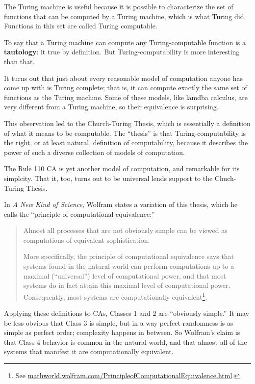 \documentclass[10pt]{book}
\begin{document}
The Turing machine is useful because it is possible to characterize
the set of functions that can be computed by a Turing machine,
which is what Turing did.  Functions in this set are
called Turing computable.

To say that a Turing machine can compute any Turing-computable
function is a {\bf tautology}: it true by definition.  But
Turing-computability is more interesting than that.

It turns out that just about every reasonable model of computation
anyone has come up with is Turing complete; that is, it can compute
exactly the same set of functions as the Turing machine.
Some of these models, like lamdba calculus, are very different
from a Turing machine, so their equivalence is surprising.

This observation led to the Church-Turing Thesis, which is
essentially a definition of what it means to be computable.
The ``thesis'' is that Turing-computability is the right,
or at least natural, definition of computability, because 
it describes the power of such a diverse collection of models
of computation.

The Rule 110 CA is yet another model of computation, and remarkable
for its simplcity.  That it, too, turns out to be universal lends
support to the Chuch-Turing Thesis.

In {\em A New Kind of Science}, Wolfram states a variation of this
thesis, which he calls the ``principle of computational equivalence:''

\begin{quote}
Almost all processes that are not obviously simple can be viewed as
computations of equivalent sophistication.

More specifically, the principle of computational equivalence says
that systems found in the natural world can perform computations up to
a maximal (``universal'') level of computational power, and that most
systems do in fact attain this maximal level of computational
power. Consequently, most systems are computationally
equivalent\footnote{See
  \url{mathworld.wolfram.com/PrincipleofComputationalEquivalence.html}.}.
\end{quote}

Applying these definitions to CAs, Classes 1 and 2 are ``obviously
simple.''  It may be less obvious that Class 3 is simple, but in a way
perfect randomness is as simple as perfect order; complexity happens
in between.  So Wolfram's claim is that Class 4 behavior is common in
the natural world, and that almost all of the systems that manifest it
are computationally equivalent.
\end{document}
